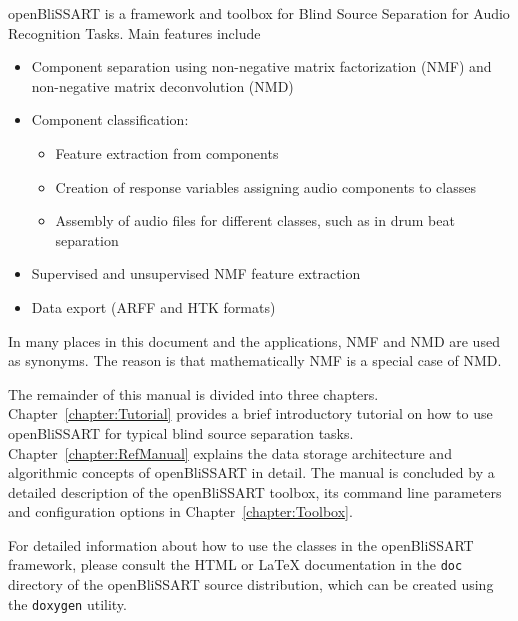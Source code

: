 %
%


openBliSSART is a framework and toolbox for Blind Source Separation for Audio
Recognition Tasks. Main features include

\begin{itemize}
\item Component separation using non-negative matrix factorization (NMF)
  \cite{LeeSeung1999,Smaragdis2003,LeeSeung2001} and non-negative matrix deconvolution
  (NMD) \cite{Smaragdis2004}
\item Component classification:
\begin{itemize}
    \item Feature extraction from components
    \item Creation of response variables assigning audio components to classes
    \item Assembly of audio files for different
    classes, such as in drum beat separation \cite{Virtanen2005}
\end{itemize}
\item Supervised and unsupervised NMF feature extraction
\item Data export (ARFF \cite{Weka} and HTK \cite{HTKBook} formats)
\end{itemize}

\begin{leftbar}
In many places in this document and the applications, NMF and NMD are used
as synonyms. The reason is that mathematically NMF is a special case of NMD.
\end{leftbar}

The remainder of this manual is divided into three chapters.
Chapter~\ref{chapter:Tutorial} provides a brief introductory tutorial on how to
use openBliSSART for typical blind source separation tasks.
Chapter~\ref{chapter:RefManual} explains the data storage architecture and
algorithmic concepts of openBliSSART in detail. The manual is concluded by a
detailed description of the openBliSSART toolbox, its command line parameters
and configuration options in Chapter~\ref{chapter:Toolbox}.

For detailed information about how to use the classes in the openBliSSART
framework, please consult the HTML or LaTeX documentation in the {\tt doc}
directory of the openBliSSART source distribution, which can be created using
the {\tt doxygen} utility.

